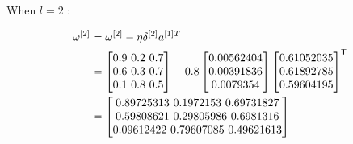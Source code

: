 \documentclass{article}
\begin{document}
\noindent When $l = 2$ :

\[
    \begin{aligned}
        \omega^{[2]} & =\omega^{[2]}-\eta\delta^{[2]}a^{[1]T} \\
                     & =\begin{bmatrix}
                            0.9 $ 0.2 $ 0.7 \\
                            0.6 $ 0.3 $ 0.7 \\
                            0.1 $ 0.8 $ 0.5 \\
                        \end{bmatrix}
        - 0.8 \begin{bmatrix}
                  0.00562404 \\
                  0.00391836 \\
                  0.0079354  \\
              \end{bmatrix}
        \begin{bmatrix}
            0.61052035 \\
            0.61892785 \\
            0.59604195 \\
        \end{bmatrix}^{\mathsf{T}}                      \\
                     & = \begin{bmatrix}
                             0.89725313 $ 0.1972153  $ 0.69731827 \\
                             0.59808621 $ 0.29805986 $ 0.6981316  \\
                             0.09612422 $ 0.79607085 $ 0.49621613 \\
                         \end{bmatrix}
    \end{aligned}
\]
\end{document}
